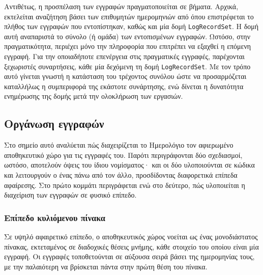 Αντιθέτως, η προσπέλαση των εγγραφών πραγματοποιείται σε βήματα. Αρχικά,
εκτελείται αναζήτηση βάσει των επιθυμητών ημερομηνιών από όπου επιστρέφεται το
πλήθος των εγγραφών που εντοπίστηκαν, καθώς και μία δομή \verb~LogRecordSet~. H
δομή αυτή αναπαριστά το σύνολο (ή ομάδα) των εντοπισμένων εγγραφών.
Ωστόσο, στην πραγματικότητα, περιέχει μόνο την πληροφορία που επιτρέπει να
εξαχθεί η επόμενη εγγραφή.
Για την οποιαδήποτε επενέργεια στις πραγματικές εγγραφές, παρέχονται ξεχωριστές
συναρτήσεις, κάθε μία δεχόμενη τη δομή \verb~LogRecordSet~. Με τον τρόπο αυτό
γίνεται γνωστή η κατάσταση του τρέχοντος συνόλου ώστε να προσαρμόζεται
καταλλήλως η συμπεριφορά της εκάστοτε συνάρτησης, ενώ δίνεται η δυνατότητα
ενημέρωσης της δομής μετά την ολοκλήρωση των εργασιών.



\subsection{Οργάνωση εγγραφών}

Στο σημείο αυτό αναλύεται πώς διαχειρίζεται το Ημερολόγιο τον αφιερωμένο
αποθηκευτικό χώρο για τις εγγραφές του. Παρότι περιγράφονται δύο σχεδιασμοί,
ωστόσο, αποτελούν όψεις του ίδιου νομίσματος· και οι δύο υλοποιούνται σε κώδικα
και λειτουργούν ο ένας πάνω από τον άλλο, προσδίδοντας διαφορετικά επίπεδα
αφαίρεσης. Στο πρώτο κομμάτι περιγράφεται  ενώ στο δεύτερο, πώς υλοποιείται η
διαχείριση των εγγραφών σε φυσικό επίπεδο.

\subsubsection{Επίπεδο κυλιόμενου πίνακα}
\label{ssubsec:log:linear}

Σε υψηλό αφαιρετικό επίπεδο, ο αποθηκευτικός χώρος νοείται ως ένας μονοδιάστατος
πίνακας, εκτεταμένος σε διαδοχικές θέσεις μνήμης, κάθε στοιχείο του οποίου είναι
μία εγγραφή. Οι εγγραφές τοποθετούνται σε αύξουσα σειρά βάσει της ημερομηνίας
τους, με την παλαιότερη να βρίσκεται πάντα στην πρώτη θέση του πίνακα.

